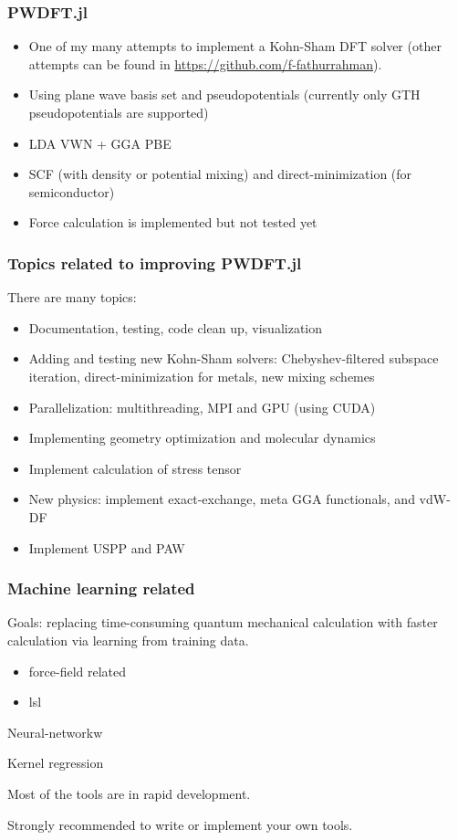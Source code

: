 \documentclass[english,9pt]{beamer}
\begin{document}
\begin{frame}
\frametitle{PWDFT.jl}

\begin{itemize}
\item One of my many attempts to implement a Kohn-Sham DFT solver
(other attempts can be found in 
{\footnotesize\url{https://github.com/f-fathurrahman}}).
\item Using plane wave basis set and pseudopotentials (currently only GTH pseudopotentials
are supported)
\item LDA VWN + GGA PBE
\item SCF (with density or potential mixing) and direct-minimization (for semiconductor)
\item Force calculation is implemented but not tested yet
\end{itemize}

\end{frame}


\begin{frame}
\frametitle{Topics related to improving PWDFT.jl}

There are many topics:

\begin{itemize}
\item Documentation, testing, code clean up, visualization
\item Adding and testing new Kohn-Sham solvers: Chebyshev-filtered
subspace iteration, direct-minimization for metals, new mixing schemes
\item Parallelization: multithreading, MPI and GPU (using CUDA)
\item Implementing geometry optimization and molecular dynamics
\item Implement calculation of stress tensor
\item New physics: implement exact-exchange, meta GGA functionals, and vdW-DF
\item Implement USPP and PAW
\end{itemize}


\end{frame}



\begin{frame}
\frametitle{Machine learning related}

Goals: replacing time-consuming quantum mechanical calculation with faster calculation
via learning from training data.

\begin{itemize}
\item force-field related
\item lsl
\end{itemize}

Neural-networkw

Kernel regression

Most of the tools are in rapid development.

Strongly recommended to write or implement your own tools.

\end{frame}
\end{document}
